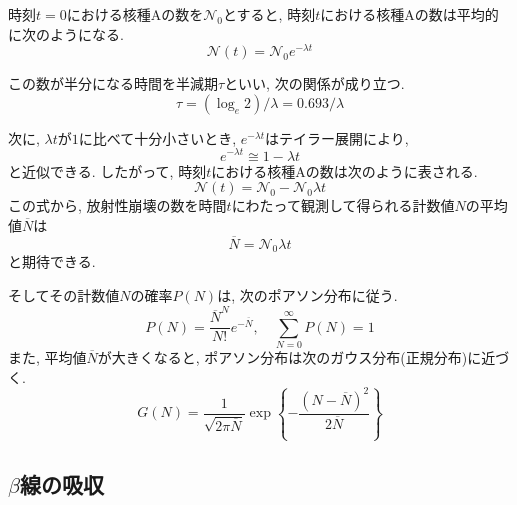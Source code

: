 \documentclass{jarticle}
\begin{document}
時刻$t=0$における核種$\mathrm{A}$の数を$\mathcal{N}_0$とすると, 時刻$t$における核種$\mathrm{A}$の数は平均的に次のようになる.
\begin{equation}
  \mathcal{N}(t) = \mathcal{N}_0 e^{-\lambda t}
\end{equation}

この数が半分になる時間を半減期$\tau$といい, 次の関係が成り立つ.
\begin{equation}
  \tau = (\log_e 2)/\lambda
  = 0.693/\lambda
\end{equation}

次に, $\lambda t$が$1$に比べて十分小さいとき, $e^{-\lambda t}$はテイラー展開により,
\begin{equation}
  e^{-\lambda t} \cong 1 - \lambda t
\end{equation}
と近似できる.
したがって, 時刻$t$における核種$\mathrm{A}$の数は次のように表される.
\begin{equation}
  \mathcal{N}(t)=\mathcal{N}_0-\mathcal{N}_0\lambda t
\end{equation}
この式から, 放射性崩壊の数を時間$t$にわたって観測して得られる計数値$N$の平均値$\overline{N}$は
\begin{equation}
  \overline{N} = \mathcal{N}_0\lambda t
\end{equation}
と期待できる.

そしてその計数値$N$の確率$P(N)$は, 次のポアソン分布に従う.
\begin{equation}
  P(N) = \frac{\overline{N}^N}{N!}e^{-\overline{N}}, \quad
  \sum_{N=0}^{\infty} P(N) = 1
\end{equation}
また, 平均値$\overline{N}$が大きくなると, ポアソン分布は次のガウス分布(正規分布)に近づく.
\begin{equation}
  G(N) = \frac{1}{\sqrt{2\pi\overline{N}}} \exp \left\{-\frac{(N-\overline{N})^2}{2\overline{N}}\right\}
\end{equation}


\subsection{$\beta$線の吸収}
\end{document}
